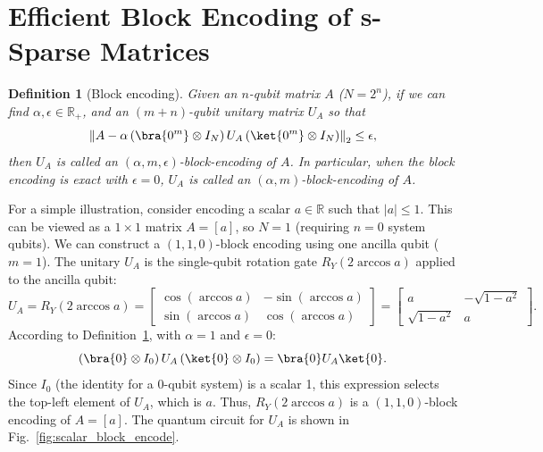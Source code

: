 \documentclass{article}
\newtheorem{definition}{Definition}[section]
\begin{document}
    \section{Efficient Block Encoding of s-Sparse Matrices}
    \begin{definition}[Block encoding]
        \label{def:block_encoding}
        Given an $n$-qubit matrix $A$ ($N = 2^n$), if we can find $\alpha, \epsilon \in \mathbb{R}_+$, and an $(m + n)$-qubit unitary matrix $U_A$ so that
        \begin{equation}
            \left\| A - \alpha \left( \bra{0^m} \otimes I_N \right) U_A \left( \ket{0^m} \otimes I_N \right) \right\|_2 \leq \epsilon,\label{eq:equation2}
        \end{equation}
        then $U_A$ is called an $(\alpha, m, \epsilon)$-block-encoding of $A$. In particular, when the block encoding is exact with $\epsilon = 0$, $U_A$ is called an $(\alpha, m)$-block-encoding of $A$.
    \end{definition}

    For a simple illustration, consider encoding a scalar $a \in \mathbb{R}$ such that $|a| \leq 1$. This can be viewed as a $1 \times 1$ matrix $A=[a]$, so $N=1$ (requiring $n=0$ system qubits). We can construct a $(1, 1, 0)$-block encoding using one ancilla qubit ($m=1$). The unitary $U_A$ is the single-qubit rotation gate $R_Y(2 \arccos a)$ applied to the ancilla qubit:
    \begin{equation}
        U_A = R_Y(2 \arccos a) =
        \begin{bmatrix}
            \cos(\arccos a) & -\sin(\arccos a) \\ \sin(\arccos a) & \cos(\arccos a)
        \end{bmatrix} =
        \begin{bmatrix}
            a & -\sqrt{1-a^2} \\ \sqrt{1-a^2} & a
        \end{bmatrix}.\label{eq:equation3}
    \end{equation}
    According to Definition~\ref{def:block_encoding}, with $\alpha=1$ and $\epsilon=0$:
    $$ \left( \bra{0} \otimes I_0 \right) U_A \left( \ket{0} \otimes I_0 \right) = \bra{0} U_A \ket{0}. $$
    Since $I_0$ (the identity for a 0-qubit system) is a scalar 1, this expression selects the top-left element of $U_A$, which is $a$. Thus, $R_Y(2 \arccos a)$ is a $(1,1,0)$-block encoding of $A=[a]$. The quantum circuit for $U_A$ is shown in Fig.~\ref{fig:scalar_block_encode}.
\end{document}
